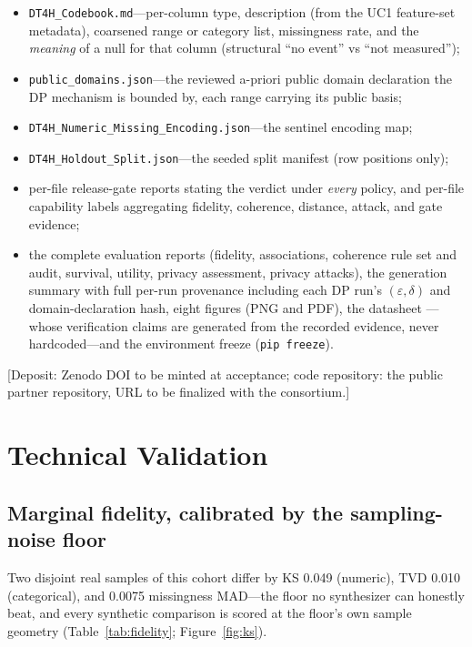 \documentclass[11pt,a4paper]{article}
\newcommand{\eps}{\ensuremath{\varepsilon}}
\begin{document}
\begin{itemize}
\item \texttt{DT4H\_Codebook.md}---per-column type, description (from the UC1
feature-set metadata), coarsened range or category list, missingness rate, and the
\emph{meaning} of a null for that column (structural ``no event'' vs ``not
measured'');
\item \texttt{public\_domains.json}---the reviewed a-priori public domain
declaration the DP mechanism is bounded by, each range carrying its public basis;
\item \texttt{DT4H\_Numeric\_Missing\_Encoding.json}---the sentinel encoding map;
\item \texttt{DT4H\_Holdout\_Split.json}---the seeded split manifest (row positions
only);
\item per-file release-gate reports stating the verdict under \emph{every} policy,
and per-file capability labels aggregating fidelity, coherence, distance, attack,
and gate evidence;
\item the complete evaluation reports (fidelity, associations, coherence rule set
and audit, survival, utility, privacy assessment, privacy attacks), the generation
summary with full per-run provenance including each DP run's $(\eps, \delta)$ and
domain-declaration hash, eight figures (PNG and PDF), the datasheet
\citep{gebru2021datasheets}---whose verification claims are generated from the
recorded evidence, never hardcoded---and the environment freeze
(\texttt{pip freeze}).
\end{itemize}

[Deposit: Zenodo DOI to be minted at acceptance; code repository: the public
partner repository, URL to be finalized with the consortium.]

\section{Technical Validation}

\subsection{Marginal fidelity, calibrated by the sampling-noise floor}

Two disjoint real samples of this cohort differ by KS 0.049 (numeric), TVD 0.010
(categorical), and 0.0075 missingness MAD---the floor no synthesizer can honestly
beat, and every synthetic comparison is scored at the floor's own sample geometry
(Table~\ref{tab:fidelity}; Figure~\ref{fig:ks}).
\end{document}
